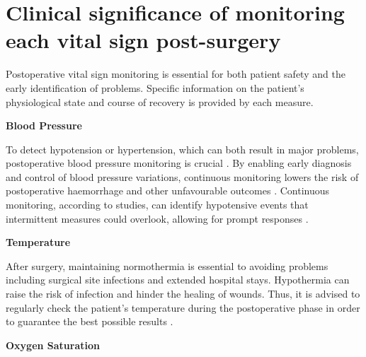 \section{Clinical significance of monitoring each vital sign post-surgery} %

Postoperative vital sign monitoring is essential for both patient safety and the early identification of problems. Specific information on the patient's physiological state and course of recovery is provided by each measure.

\textbf{Blood Pressure}

To detect hypotension or hypertension, which can both result in major problems, postoperative blood pressure monitoring is crucial \cite{Kachel2021-pb}. By enabling early diagnosis and control of blood pressure variations, continuous monitoring lowers the risk of postoperative haemorrhage and other unfavourable outcomes \cite{Demetz2024-pl}. Continuous monitoring, according to studies, can identify hypotensive events that intermittent measures could overlook, allowing for prompt responses \cite{Noto2024-uz}.

\textbf{Temperature}

After surgery, maintaining normothermia is essential to avoiding problems including surgical site infections and extended hospital stays. Hypothermia can raise the risk of infection and hinder the healing of wounds. Thus, it is advised to regularly check the patient's temperature during the postoperative phase in order to guarantee the best possible results \cite{Frank1999-rb}.

\textbf{Oxygen Saturation}

